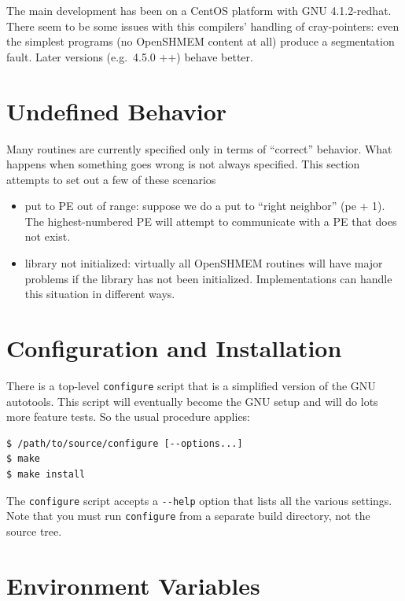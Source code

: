 \documentclass[english]{article}
\begin{document}
The main development has been on a CentOS platform with GNU
4.1.2-redhat.  There seem to be some issues with this compilers'
handling of cray-pointers: even the simplest programs (no OpenSHMEM
content at all) produce a segmentation fault. Later versions
(e.g.\ 4.5.0 ++) behave better.

\section{Undefined Behavior}

Many routines are currently specified only in terms of ``correct''
behavior. What happens when something goes wrong is not always
specified.  This section attempts to set out a few of these scenarios
\begin{itemize}
\item put to PE out of range: suppose we do a put to ``right
neighbor'' (pe + 1). The highest-numbered PE will attempt to
communicate with a PE that does not exist.
\item library not initialized: virtually all OpenSHMEM routines will
have major problems if the library has not been
initialized. Implementations can handle this situation in different
ways.
\end{itemize}

\section{Configuration and Installation}

There is a top-level \texttt{configure} script that is a simplified
version of the GNU autotools. This script will eventually become the
GNU setup and will do lots more feature tests. So the usual procedure
applies:

\begin{lstlisting}
$ /path/to/source/configure [--options...]
$ make
$ make install
\end{lstlisting}

The \texttt{configure} script accepts a
\texttt{-{}-help} option that lists all the various settings.  Note
that you must run \texttt{configure} from a separate build directory,
not the source tree.

\section{Environment Variables\label{sec:Environment-Variables}}
\end{document}
